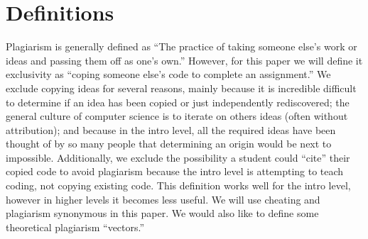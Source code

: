 \documentclass[letterpaper,10pt,conference]{IEEEtran}
\begin{document}
\section{Definitions}
Plagiarism is generally defined as ``The practice of taking someone else's work or ideas and passing them off as one's own.''\cite{oxed}  However, for this paper we will define it exclusivity as ``coping someone else's code to complete an assignment.''  We exclude copying ideas for several reasons, mainly because it is incredible difficult to determine if an idea has been copied or just independently rediscovered; the general culture of computer science is to iterate on others ideas (often without attribution\cite{gibson-reuse}); and because in the intro level, all the required ideas have been thought of by so many people that determining an origin would be next to impossible.  Additionally, we exclude the possibility a student could ``cite'' their copied code to avoid plagiarism because the intro level is attempting to teach coding, not copying existing code.  This definition works well for the intro level, however in higher levels it becomes less useful.  We will use cheating and plagiarism synonymous in this paper.  We would also like to define some theoretical plagiarism ``vectors.''
\end{document}
